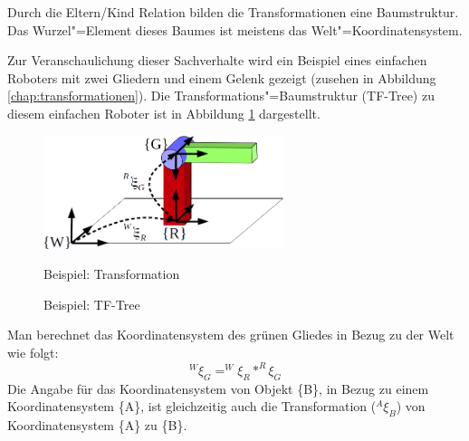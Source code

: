 Durch die Eltern/Kind Relation bilden die Transformationen eine Baumstruktur.
Das Wurzel"=Element dieses Baumes ist meistens das Welt"=Koordinatensystem.


Zur Veranschaulichung dieser Sachverhalte wird ein Beispiel eines einfachen Roboters mit zwei Gliedern und einem Gelenk gezeigt (zusehen in Abbildung \ref{chap:transformationen}).
Die Transformations"=Baumstruktur (TF-Tree) zu diesem einfachen Roboter ist in Abbildung \ref{Ab:tf-tree} dargestellt.


\begin{figure}[ht!]
\begin{minipage}{0.5\textwidth}
	\centering
	\includegraphics[width=7cm]{images/Transformation.png}
	\caption{Beispiel: Transformation}
	\label{Ab:transformation}
\end{minipage}
\begin{minipage}{0.48\textwidth}
\centering
{}
	\caption{Beispiel: TF-Tree}
	\label{Ab:tf-tree}

\end{minipage}
\end{figure}

Man berechnet das Koordinatensystem des grünen Gliedes in Bezug zu der Welt wie folgt:
\begin{equation}
^{W}\xi_{G} = ^{W}\xi_{R} * ^{R}\xi_{G}
\end{equation}
Die Angabe für das Koordinatensystem von Objekt \{B\}, in Bezug zu einem Koordinatensystem \{A\}, ist gleichzeitig auch die Transformation ($^{A}\xi_{B}$) von Koordinatensystem \{A\} zu \{B\}.

